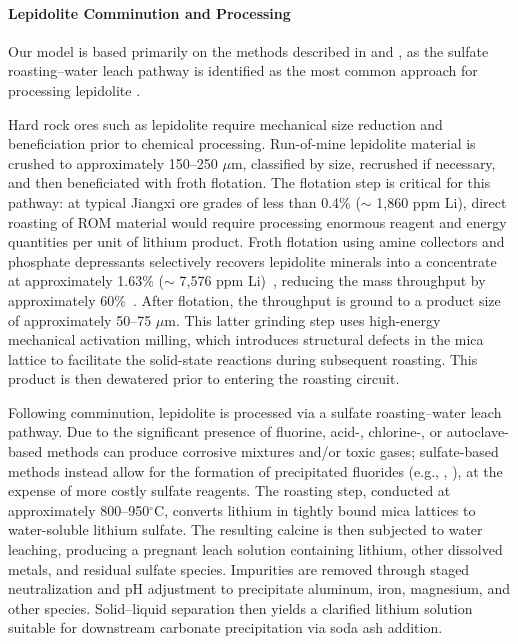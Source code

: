 \documentclass{article}
\renewcommand\_{\textunderscore\allowbreak}
\begin{document}
\paragraph{Lepidolite Comminution and Processing}\label{app:04-methods-facilitychoices-lepidproc}\leavevmode\par

Our model is based primarily on the methods described in \citet{dengSystematicReviewSulfate2026} and \citet{yanExtractionLithiumLepidolite2012}, as the sulfate roasting--water leach pathway is identified as the most common approach for processing lepidolite \citep{gaoLithiumExtractionHard2023, parkEffectiveLithiumExtraction2023, nanMethodsExtractingLithium2019, nanMethodsExtractingLithium2022, zouMethodEfficientLithium2024}.

Hard rock ores such as lepidolite require mechanical size reduction and beneficiation prior to chemical processing. Run-of-mine lepidolite material is crushed to approximately 150--250 $\mu$m, classified by size, recrushed if necessary, and then beneficiated with froth flotation. The flotation step is critical for this pathway: at typical Jiangxi ore grades of less than 0.4\%  ($\sim$ 1,860 ppm Li), direct roasting of ROM material would require processing enormous reagent and energy quantities per unit of lithium product. Froth flotation using amine collectors and phosphate depressants selectively recovers lepidolite minerals into a concentrate at approximately 1.63\%  ($\sim$ 7,576 ppm Li)~\cite{garrettHandbookLithiumNatural2004, jiaoKeyTechnologiesDevelopment2024}, reducing the mass throughput by approximately 60\%~\citep{jiaoKeyTechnologiesDevelopment2024}. After flotation, the throughput is ground to a product size of approximately 50--75 $\mu$m. This latter grinding step uses high-energy mechanical activation milling, which introduces structural defects in the mica lattice to facilitate the solid-state reactions during subsequent roasting. This product is then dewatered prior to entering the roasting circuit.

Following comminution, lepidolite is processed via a sulfate roasting--water leach pathway. Due to the significant presence of fluorine, acid-, chlorine-, or autoclave-based methods can produce corrosive mixtures and/or toxic gases; sulfate-based methods instead allow for the formation of precipitated fluorides (e.g., , ), at the expense of more costly sulfate reagents. The roasting step, conducted at approximately 800--950$^\circ$C, converts lithium in tightly bound mica lattices to water-soluble lithium sulfate. The resulting calcine is then subjected to water leaching, producing a pregnant leach solution containing lithium, other dissolved metals, and residual sulfate species. Impurities are removed through staged neutralization and pH adjustment to precipitate aluminum, iron, magnesium, and other species. Solid--liquid separation then yields a clarified lithium solution suitable for downstream carbonate precipitation via soda ash addition.
\end{document}
